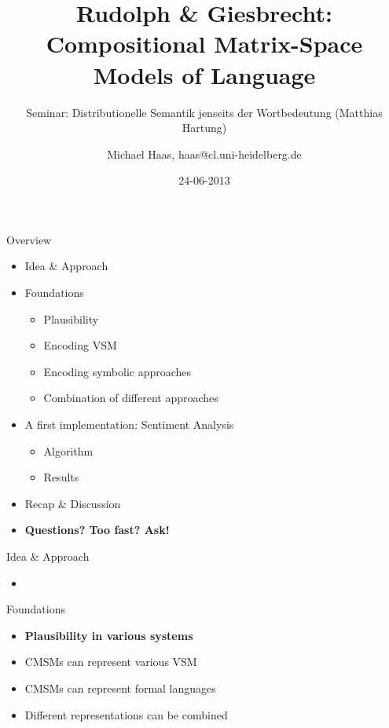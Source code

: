 \documentclass[12pt,a4paper]{beamer}
\author{Michael Haas, haas@cl.uni-heidelberg.de}
\title{Rudolph \& Giesbrecht: Compositional Matrix-Space Models of Language}
\subtitle{Seminar: Distributionelle Semantik jenseits der Wortbedeutung (Matthias Hartung)}
\date{24-06-2013}
\begin{document}
\begin{frame}
\maketitle
\end{frame}

\begin{frame}{Overview}
\begin{itemize}
\item Idea \& Approach %
\item Foundations
\begin{itemize}
    \item Plausibility %
    \item Encoding VSM %
    \item Encoding symbolic approaches
    \item Combination of different approaches
\end{itemize}
\item A first implementation: Sentiment Analysis
\begin{itemize}
    \item Algorithm %
    \item Results %
\end{itemize}
\item Recap \& Discussion
\item \textbf{Questions? Too fast? Ask!}
\end{itemize}
\end{frame}

\begin{frame}{Idea \& Approach}
\begin{itemize}
\item
\end{itemize}
\end{frame}


\begin{frame}{Foundations}
\begin{itemize}
\item \textbf{Plausibility in various systems}
\item CMSMs can represent various VSM
\item CMSMs can represent formal languages
\item Different representations can be combined
\end{itemize}
\end{frame}
\end{document}
